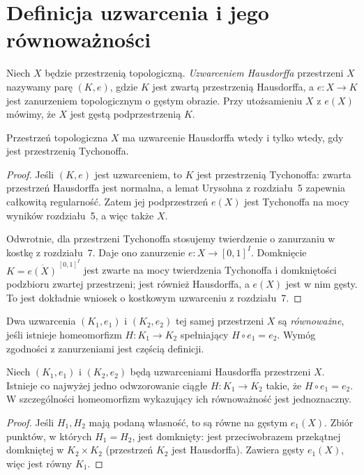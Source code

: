 \section{Definicja uzwarcenia i jego równoważności}
\label{sec:topog-uzwarcenia-definicje}

\begin{definicja}[Uzwarcenie]
\label{def:topog-uzwarcenia-uzwarcenie}
Niech $X$ będzie przestrzenią topologiczną.
\emph{Uzwarceniem Hausdorffa} przestrzeni $X$
nazywamy parę $(K,e)$, gdzie $K$ jest
zwartą przestrzenią Hausdorffa, a
$e\colon X\to K$ jest zanurzeniem
topologicznym o gęstym obrazie.
Przy utożsamieniu $X$ z $e(X)$
mówimy, że $X$ jest gęstą
podprzestrzenią $K$.
\end{definicja}

\begin{twierdzenie}
\label{thm:topog-uzwarcenia-istnienie}
Przestrzeń topologiczna $X$ ma uzwarcenie
Hausdorffa wtedy i tylko wtedy, gdy
jest przestrzenią Tychonoffa.
\end{twierdzenie}
\begin{proof}
Jeśli $(K,e)$ jest uzwarceniem,
to $K$ jest przestrzenią Tychonoffa:
zwarta przestrzeń Hausdorffa jest
normalna, a lemat Urysohna z rozdziału~5
zapewnia całkowitą regularność.
Zatem jej podprzestrzeń $e(X)$
jest Tychonoffa na mocy wyników
rozdziału~5, a więc także $X$.

Odwrotnie, dla przestrzeni Tychonoffa
stosujemy twierdzenie
o zanurzaniu w kostkę z rozdziału~7.
Daje ono zanurzenie
$e\colon X\to[0,1]^I$.
Domknięcie
$K=\overline{e(X)}^{\, [0,1]^I}$
jest zwarte na mocy twierdzenia
Tychonoffa i domkniętości
podzbioru zwartej przestrzeni;
jest również Hausdorffa,
a $e(X)$ jest w nim gęsty.
To jest dokładnie wniosek
o kostkowym uzwarceniu
z rozdziału~7.
\end{proof}

\begin{definicja}
\label{def:topog-uzwarcenia-rownowaznosc}
Dwa uzwarcenia $(K_1,e_1)$
i $(K_2,e_2)$ tej samej przestrzeni $X$
są \emph{równoważne}, jeśli istnieje
homeomorfizm $H\colon K_1\to K_2$
spełniający $H\circ e_1=e_2$.
Wymóg zgodności z zanurzeniami
jest częścią definicji.
\end{definicja}

\begin{stwierdzenie}
\label{prop:topog-uzwarcenia-homeomorfizm-jednoznaczny}
Niech $(K_1,e_1)$ i $(K_2,e_2)$
będą uzwarceniami Hausdorffa przestrzeni $X$.
Istnieje co najwyżej jedno
odwzorowanie ciągłe $H\colon K_1\to K_2$
takie, że $H\circ e_1=e_2$.
W szczególności homeomorfizm
wykazujący ich równoważność
jest jednoznaczny.
\end{stwierdzenie}
\begin{proof}
Jeśli $H_1,H_2$ mają podaną własność,
to są równe na gęstym $e_1(X)$.
Zbiór punktów, w których
$H_1=H_2$, jest domknięty:
jest przeciwobrazem przekątnej
domkniętej w $K_2\times K_2$
(przestrzeń $K_2$ jest Hausdorffa).
Zawiera gęsty $e_1(X)$,
więc jest równy $K_1$.
\end{proof}


